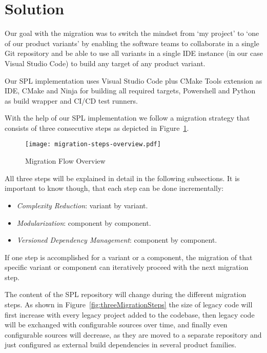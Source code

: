 \section{Solution}\label{solution}

Our goal with the migration was to switch the mindset from `my project' to `one
of our product variants' by enabling the software teams to collaborate in a
single Git repository and be able to use all variants in a single IDE instance
(in our case Visual Studio Code) to build any target of any product variant.

Our SPL implementation uses Visual Studio Code plus CMake Tools extension as
IDE, CMake and Ninja for building all required targets, Powershell and Python as
build wrapper and CI/CD test runners.

With the help of our SPL implementation we follow a migration strategy that
consists of three consecutive steps as depicted in Figure~\ref{fig:migrationFlow}.

\begin{figure}[htb]
  \centering
  \texttt{[image: migration-steps-overview.pdf]}
  \caption{Migration Flow Overview}
  \label{fig:migrationFlow}
\end{figure}

All three steps will be explained in detail in the following subsections.
It is important to know though, that each step can be done incrementally:
\begin{itemize}
  \item \textit{Complexity Reduction}: variant by variant.
  \item \textit{Modularization}: component by component.
  \item \textit{Versioned Dependency Management}: component by component.
\end{itemize}

If one step is accomplished for a variant or a component, the migration of that
specific variant or component can iteratively proceed with the next migration
step.

The content of the SPL repository will change during the different migration
steps. As shown in Figure~\ref{fig:threeMigrationSteps} the size of legacy code
will first increase with every legacy project added to the codebase, then legacy
code will be exchanged with configurable sources over time, and finally even
configurable sources will decrease, as they are moved to a separate repository
and just configured as external build dependencies in several product families.

